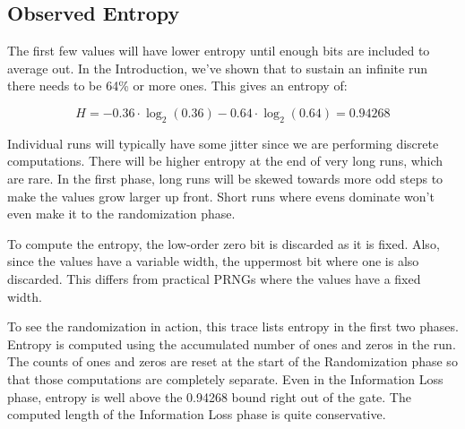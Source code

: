 \documentclass[preprint,natbib]{sigplanconf}
\begin{document}
\subsection{Observed Entropy}

The first few values will have lower entropy until enough bits are included to average out. In the Introduction, we've shown that to sustain an infinite run there needs to be 64\% or more ones. This gives an entropy of:

\[ H = -0.36 \cdot \log_2(0.36) - 0.64 \cdot \log_2(0.64) = 0.94268 \]

Individual runs will typically have some jitter since we are performing discrete computations. There will be higher entropy at the end of very long runs, which are rare. In the first phase, long runs will be skewed towards more odd steps to make the values grow larger up front. Short runs where evens dominate won't even make it to the randomization phase.

To compute the entropy, the low-order zero bit is discarded as it is fixed. Also, since the values have a variable width, the uppermost bit where one is also discarded. This differs from practical PRNGs where the values have a fixed width.

To see the randomization in action, this trace lists entropy in the first two phases. Entropy is computed using the accumulated number of ones and zeros in the run. The counts of ones and zeros are reset at the start of the Randomization phase so that those computations are completely separate. Even in the Information Loss phase, entropy is well above the 0.94268 bound right out of the gate. The computed length of the Information Loss phase is quite conservative.
\end{document}
